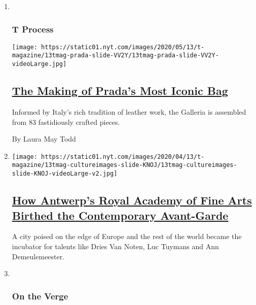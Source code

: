 \begin{enumerate}
\def\labelenumi{\arabic{enumi}.}
\item ~
  \hypertarget{t-process}{%
  \subsubsection{T Process}\label{t-process}}

  \texttt{[image: https://static01.nyt.com/images/2020/05/13/t-magazine/13tmag-prada-slide-VV2Y/13tmag-prada-slide-VV2Y-videoLarge.jpg]}

  \hypertarget{the-making-of-pradas-most-iconic-bag}{%
  \subsection{\texorpdfstring{\href{/2020/05/13/t-magazine/prada-handbag-making-of.html}{The
  Making of Prada's Most Iconic
  Bag}}{The Making of Prada's Most Iconic Bag}}\label{the-making-of-pradas-most-iconic-bag}}

  Informed by Italy's rich tradition of leather work, the Galleria is
  assembled from 83 fastidiously crafted pieces.

  By Laura May Todd
\item
  \texttt{[image: https://static01.nyt.com/images/2020/04/13/t-magazine/13tmag-cultureimages-slide-KNOJ/13tmag-cultureimages-slide-KNOJ-videoLarge-v2.jpg]}

  \hypertarget{how-antwerps-royal-academy-of-fine-arts-birthed-the-contemporary-avant-garde}{%
  \subsection{\texorpdfstring{\href{/interactive/2020/04/13/t-magazine/royal-academy-antwerp.html}{How
  Antwerp's Royal Academy of Fine Arts Birthed the Contemporary
  Avant-Garde}}{How Antwerp's Royal Academy of Fine Arts Birthed the Contemporary Avant-Garde}}\label{how-antwerps-royal-academy-of-fine-arts-birthed-the-contemporary-avant-garde}}

  A city poised on the edge of Europe and the rest of the world became
  the incubator for talents like Dries Van Noten, Luc Tuymans and Ann
  Demeulemeester.
\item ~
  \hypertarget{on-the-verge}{%
  \subsubsection{On the Verge}\label{on-the-verge}}


\end{enumerate}
